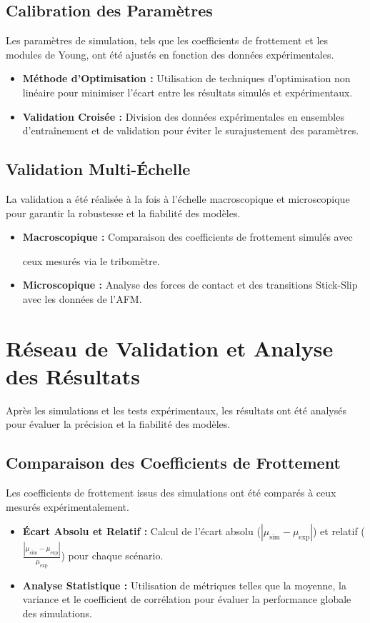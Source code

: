 \subsection{Calibration des Paramètres}
Les paramètres de simulation, tels que les coefficients de frottement et les modules de Young, ont été ajustés en fonction des données expérimentales.
\begin{itemize}
    \item \textbf{Méthode d'Optimisation :} Utilisation de techniques d'optimisation non linéaire pour minimiser l'écart entre les résultats simulés et expérimentaux.
    \item \textbf{Validation Croisée :} Division des données expérimentales en ensembles d'entraînement et de validation pour éviter le surajustement des paramètres.
\end{itemize}

\subsection{Validation Multi-Échelle}
La validation a été réalisée à la fois à l'échelle macroscopique et microscopique pour garantir la robustesse et la fiabilité des modèles.
\begin{itemize}
    \item \textbf{Macroscopique :} Comparaison des coefficients de frottement simulés avec

 ceux mesurés via le tribomètre.
    \item \textbf{Microscopique :} Analyse des forces de contact et des transitions Stick-Slip avec les données de l'AFM.
\end{itemize}

\section{Réseau de Validation et Analyse des Résultats}
Après les simulations et les tests expérimentaux, les résultats ont été analysés pour évaluer la précision et la fiabilité des modèles.

\subsection{Comparaison des Coefficients de Frottement}
Les coefficients de frottement issus des simulations ont été comparés à ceux mesurés expérimentalement.
\begin{itemize}
    \item \textbf{Écart Absolu et Relatif :} Calcul de l'écart absolu ($| \mu_{\text{sim}} - \mu_{\text{exp}} |$) et relatif ($\frac{| \mu_{\text{sim}} - \mu_{\text{exp}} |}{\mu_{\text{exp}}}$) pour chaque scénario.
    \item \textbf{Analyse Statistique :} Utilisation de métriques telles que la moyenne, la variance et le coefficient de corrélation pour évaluer la performance globale des simulations.
\end{itemize}

